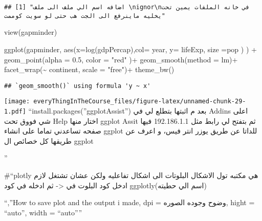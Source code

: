 \documentclass[
]{article}
\newenvironment{Shaded}{\begin{snugshade}}{\end{snugshade}}
\newcommand{\AttributeTok}[1]{\textcolor[rgb]{0.77,0.63,0.00}{#1}}
\newcommand{\FloatTok}[1]{\textcolor[rgb]{0.00,0.00,0.81}{#1}}
\newcommand{\FunctionTok}[1]{\textcolor[rgb]{0.00,0.00,0.00}{#1}}
\newcommand{\NormalTok}[1]{#1}
\newcommand{\SpecialCharTok}[1]{\textcolor[rgb]{0.00,0.00,0.00}{#1}}
\newcommand{\StringTok}[1]{\textcolor[rgb]{0.31,0.60,0.02}{#1}}
\begin{document}
\begin{verbatim}
## [1] "اضافه اسم الي ملف الى ملف \nignor\nفي خانه الملفات يمين تحت يخليه ماينرفع الى الجت هب حتى لو سويت كوممت"
\end{verbatim}

\begin{Shaded}
\begin{Highlighting}[]
\FunctionTok{view}\NormalTok{(gapminder)}
\end{Highlighting}
\end{Shaded}

\begin{Shaded}
\begin{Highlighting}[]
  \FunctionTok{ggplot}\NormalTok{(gapminder, }\FunctionTok{aes}\NormalTok{(}\AttributeTok{x=}\FunctionTok{log}\NormalTok{(gdpPercap),}\AttributeTok{col=}\NormalTok{ year, }\AttributeTok{y=}\NormalTok{ lifeExp, }\AttributeTok{size =}\NormalTok{pop )}
\NormalTok{) }\SpecialCharTok{+}
  \FunctionTok{geom\_point}\NormalTok{(}\AttributeTok{alpha =} \FloatTok{0.5}\NormalTok{, }\AttributeTok{color =} \StringTok{"red"}\NormalTok{ )}\SpecialCharTok{+}
  \FunctionTok{geom\_smooth}\NormalTok{(}\AttributeTok{method =}\NormalTok{ lm)}\SpecialCharTok{+}
  \FunctionTok{facet\_wrap}\NormalTok{(}\SpecialCharTok{\textasciitilde{}}\NormalTok{ continent, }\AttributeTok{scale =} \StringTok{"free"}\NormalTok{)}\SpecialCharTok{+}
  \FunctionTok{theme\_bw}\NormalTok{()}
\end{Highlighting}
\end{Shaded}

\begin{verbatim}
## `geom_smooth()` using formula 'y ~ x'
\end{verbatim}

\texttt{[image: everyThingInTheCourse\_files/figure-latex/unnamed-chunk-29-1.pdf]}
``install.packages(''ggplotAssist'') بعد م اثبتها بتطلع لي في Addins
اعلى شي فووق تحت Help اختار منها ggplot Assit ثم بتفتح لي رابط مثل
192.186.1.1 فيها صفحه تساعدني تماما على انشاء ggplot للداتا عن طريق يوزر
انتر فيس، و اعرف عن طريقها كل خصائص ال ggplot

''

\#``plotly هي مكتبه تول الاشكال البلوتات الى اشكال تفاعليه ولكن عشان
تشتغل لازم ادخل كود البلوت في \textless- ثم ادخله في كود ggplotly(اسم
الي حطيته)

``,''How to save plot and the output i made, dpi = وضوح وجوده الصوره,
hight = ``auto'', width = ``auto''''
\end{document}
